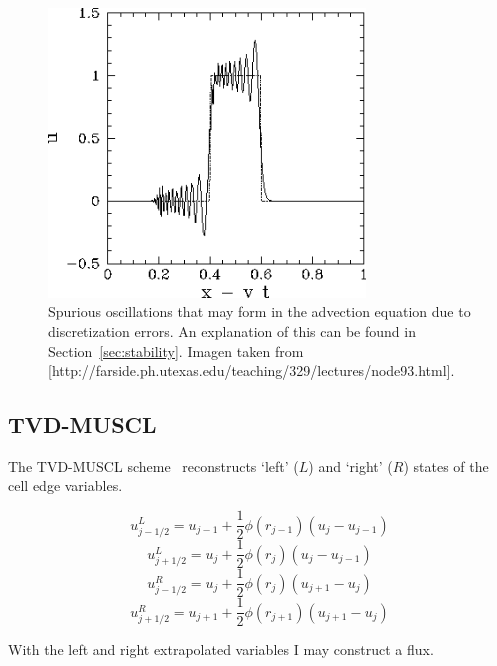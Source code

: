 \documentclass[12pt,upcase]{umlthesis}
\begin{document}
\begin{figure}[ht!]
	\centering
	\includegraphics[width=0.75\textwidth]{images/spuriousoscillations.png} 
	\caption{Spurious oscillations that may form in the advection equation due to discretization errors. An explanation of this can be found in Section~\ref{sec:stability}. Imagen taken from [http://farside.ph.utexas.edu/teaching/329/lectures/node93.html].}\label{fig:spuriousoscillations}
\end{figure}


\subsection{TVD-MUSCL}\label{sec:tvd-muscl}

The TVD-MUSCL scheme~\citep{vanleer1979} reconstructs `left' ($L$) and `right' ($R$) states of the cell edge variables. 

\begin{equation}
	u^L_{j-1/2} = u_{j-1} + \frac{1}{2} \phi(r_{j-1}) (u_j - u_{j-1})
\end{equation}
\begin{equation}
	u^L_{j+1/2} = u_{j} + \frac{1}{2} \phi(r_{j}) (u_j - u_{j-1})
\end{equation}
\begin{equation}
	u^R_{j-1/2} = u_{j} + \frac{1}{2} \phi(r_{j}) (u_{j+1} - u_{j})
\end{equation}
\begin{equation}
	u^R_{j+1/2} = u_{j+1} + \frac{1}{2} \phi(r_{j+1}) (u_{j+1} - u_{j})
\end{equation}

With the left and right extrapolated variables I may construct a flux.
\end{document}
